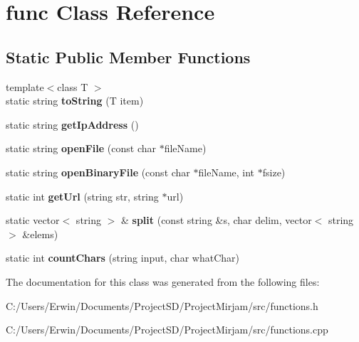 \hypertarget{classfunc}{}\section{func Class Reference}
\label{classfunc}
\subsection*{Static Public Member Functions}
\begin{DoxyCompactItemize}
\item 
\hypertarget{classfunc_ac581d02d88f923f43f6e507b135ba6e5}{}{\footnotesize template$<$class T $>$ }\\static string {\bfseries to\+String} (T item)\label{classfunc_ac581d02d88f923f43f6e507b135ba6e5}

\item 
\hypertarget{classfunc_a36bd8c048b9131d38ba31bb61bb41800}{}static string {\bfseries get\+Ip\+Address} ()\label{classfunc_a36bd8c048b9131d38ba31bb61bb41800}

\item 
\hypertarget{classfunc_a9a5d752d785a76823f94b4cc7c40f411}{}static string {\bfseries open\+File} (const char $\ast$file\+Name)\label{classfunc_a9a5d752d785a76823f94b4cc7c40f411}

\item 
\hypertarget{classfunc_a073c637fff7acd1dbd46ed0e36aca523}{}static string {\bfseries open\+Binary\+File} (const char $\ast$file\+Name, int $\ast$fsize)\label{classfunc_a073c637fff7acd1dbd46ed0e36aca523}

\item 
\hypertarget{classfunc_a7906b81c00a850d060d41ab192f26642}{}static int {\bfseries get\+Url} (string str, string $\ast$url)\label{classfunc_a7906b81c00a850d060d41ab192f26642}

\item 
\hypertarget{classfunc_a4b7932b4cfd2c66a8d64d13bec30e1c8}{}static vector$<$ string $>$ \& {\bfseries split} (const string \&s, char delim, vector$<$ string $>$ \&elems)\label{classfunc_a4b7932b4cfd2c66a8d64d13bec30e1c8}

\item 
\hypertarget{classfunc_a61132399dfb600836d144459e06491c8}{}static int {\bfseries count\+Chars} (string input, char what\+Char)\label{classfunc_a61132399dfb600836d144459e06491c8}

\end{DoxyCompactItemize}


The documentation for this class was generated from the following files\+:\begin{DoxyCompactItemize}
\item 
C\+:/\+Users/\+Erwin/\+Documents/\+Project\+S\+D/\+Project\+Mirjam/src/functions.\+h\item 
C\+:/\+Users/\+Erwin/\+Documents/\+Project\+S\+D/\+Project\+Mirjam/src/functions.\+cpp\end{DoxyCompactItemize}
